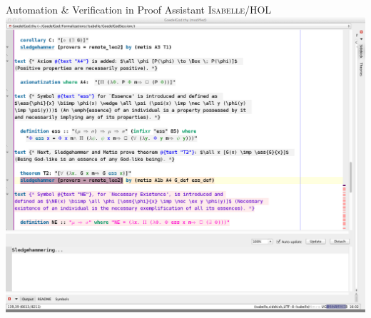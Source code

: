 \begin{frame}{Automation \& Verification in Proof Assistant
    \textsc{Isabelle/HOL}} \large
\colorbox{gray}{\includegraphics[width=.92\textwidth]{Images/Demos/IsabelleDemoGrab}} 
\end{frame}